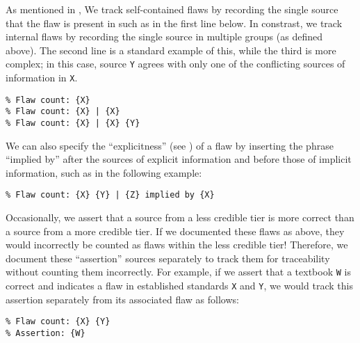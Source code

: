 As mentioned in , \oneSrcDistinct{} We track
self-contained flaws by recording the single source that the flaw is present
in such as in the first line below. In constrast, we track internal flaws
by recording the single source in multiple groups (as defined above). The
second line is a standard example of this, while the third is more complex;
in this case, source \texttt{Y} agrees with only one of the conflicting
sources of information in \texttt{X}.
\begin{displayquote}
    \texttt{\% Flaw count: \{X\}\\\% Flaw count: \{X\} | \{X\}\\
        \% Flaw count: \{X\} | \{X\} \{Y\}}
\end{displayquote}
We can also specify the ``explicitness'' (see ) of a
flaw by inserting the phrase ``implied by'' after the sources of explicit
information and before those of implicit information, such as in the
following example:
\begin{displayquote}
    \texttt{\% Flaw count: \{X\} \{Y\} | \{Z\} implied by \{X\}}
\end{displayquote}\label{less-cred-assert}%
Occasionally, we assert that a source from a less credible tier is more
correct than a source from a more credible tier.
If we documented these flaws as above, they would incorrectly be counted as
flaws within the less credible tier! Therefore, we document these
``assertion'' sources separately to track them for traceability without
counting them incorrectly.
For example, if we assert that a textbook \texttt{W} is correct and
indicates a flaw in established standards \texttt{X} and \texttt{Y}, we
would track this assertion separately from its associated flaw as follows:
\begin{displayquote}
    \texttt{\% Flaw count: \{X\} \{Y\}\\\% Assertion: \{W\}}
\end{displayquote}
